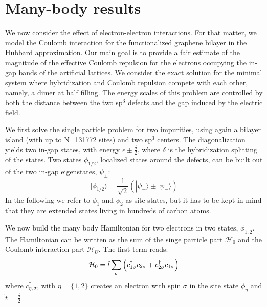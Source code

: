 \section{Many-body results}
We now consider the effect of electron-electron interactions. For that matter, we model the Coulomb interaction for the functionalized graphene bilayer in the Hubbard approximation. Our main goal is to provide a fair estimate
of the magnitude of the effective Coulomb repulsion for the electrons occupying the in-gap bands of the artificial lattices. We consider the exact solution for the minimal system where hybridization and Coulomb repulsion compete with each other, namely, a dimer at half filling. The energy scales of this problem are controlled by both the distance between the two sp$^3$ defects and the gap induced by the electric field.

We first solve the single particle problem for two impurities, using again a bilayer island (with up to N=131772 sites) and two sp$^3$ centers. The diagonalization yields two in-gap states, with energy $\epsilon\pm \frac{\delta}{2}$, where $\delta$ is the hybridization splitting of the states. 
Two states $\phi_{1/2}$, localized states around the defects, can be built out of the two in-gap eigenstates, $\psi_\pm$:
\begin{equation}
  |\phi_{1/2}\rangle = \frac{1}{\sqrt{2}}\left(|\psi_+\rangle \pm|\psi_-\rangle\right)
\end{equation}
In the following we refer to $\phi_1$ and $\phi_2$ as site states, but it has to be kept in mind that they are extended states living in hundreds of carbon atoms. 

We now build the many body Hamiltonian for two electrons in two states, $\phi_{1,2}$. The Hamiltonian can be written as the sum of the singe particle part $\mathcal{H}_0$ and the Coulomb interaction part $\mathcal{H}_{U}$. The first term reads:
\begin{equation}
{\cal H}_0= \tilde{t} \sum_{\sigma} \left(c^{\dagger}_{1\sigma}c_{2\sigma}+c^{\dagger}_{2\sigma}c_{1\sigma}\right)
\end{equation} 
where $c^{\dagger}_{\eta,\sigma}$, with $\eta=\{1,2\}$ creates an electron with spin $\sigma$ in the site state $\phi_{\eta}$ and $\tilde{t}=\frac{\delta}{2}$

